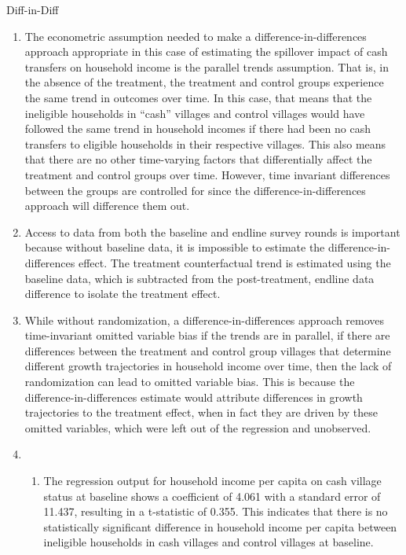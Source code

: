 \begin{homeworkProblem}{Diff-in-Diff}
    \begin{solution}
        \begin{enumerate}
            \item The econometric assumption needed to make a
                difference-in-differences approach appropriate in this case of
                estimating the spillover impact of cash transfers on household
                income is the parallel trends assumption. That is, in the 
                absence of the treatment, the treatment and control groups 
                experience the same trend in outcomes over time. In this case,
                that means that the ineligible households in ``cash'' villages
                and control villages would have followed the same trend in 
                household incomes if there had been no cash transfers to 
                eligible households in their respective villages. This also
                means that there are no other time-varying factors that 
                differentially affect the treatment and control groups over 
                time. However, time invariant differences between the groups 
                are controlled for since the difference-in-differences approach 
                will difference them out.
            \item Access to data from both the baseline and endline survey
                rounds is important because without baseline data, it is 
                impossible to estimate the difference-in-differences effect. 
                The treatment counterfactual trend is estimated using the 
                baseline data, which is subtracted from the post-treatment,
                endline data difference to isolate the treatment effect.
            \item While without randomization, a difference-in-differences 
                approach removes time-invariant omitted variable bias if the
                trends are in parallel, if there are differences 
                between the treatment and control group villages that determine
                different growth trajectories in household income over time, then
                the lack of randomization can lead to omitted variable bias.
                This is because the difference-in-differences estimate would
                attribute differences in growth trajectories to the treatment
                effect, when in fact they are driven by these omitted variables,
                which were left out of the regression and unobserved.
            \item \begin{enumerate}
                \item The regression output for household income per capita on
                    cash village status at baseline shows a coefficient of 
                    4.061 with a standard error of 11.437, resulting in a 
                    t-statistic of 0.355. This indicates that there is no 
                    statistically significant difference in household income 
                    per capita between ineligible households in cash villages
                    and control villages at baseline.


\end{enumerate}
\end{enumerate}
\end{solution}
\end{homeworkProblem}
